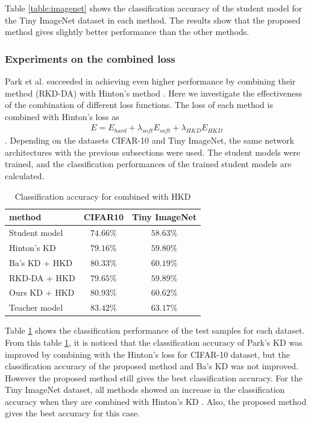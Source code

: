\documentclass[a4paper,12pt]{article}
\begin{document}
Table \ref{table:imagenet} shows the classification accuracy of the student model for the Tiny ImageNet dataset in each method.
The results show that the proposed method gives slightly better performance than the other methods.


\subsubsection{Experiments on the combined loss}

Park et al. \cite{Park2019} succeeded in achieving even higher performance by combining their method (RKD-DA) with Hinton's method \cite{Hinton2015}.
Here we investigate the effectiveness of the combination of different loss functions.
The loss of each method is combined with Hinton's loss as
\begin{align} \label{eq:distillation loss2}
E = E_{hard} + \lambda_{soft} E_{soft} + \lambda_{HKD} E_{HKD}
\end{align}.
Depending on the datasets CIFAR-10 and Tiny ImageNet, the same network architectures with the previous subsections were used.
The student models were trained, and the classification performances of the trained student models are calculated.

\begin{table}[ht]
\caption{Classification accuracy for combined with HKD}
\label{table:combined}
\begin{center}
\begin{tabular}{|l|c|c|}
\hline
method & CIFAR10 & Tiny ImageNet \\ \hline \hline
Student model &$74.66\%$  & $58.63\%$ \\ \hline
Hinton's KD & $79.16\%$ & $59.80\%$  \\ \hline
Ba's KD + HKD & $80.33\%$ & $60.19\%$  \\ \hline
RKD-DA + HKD &  $79.65\%$   & $59.89\%$      \\ \hline
Ours KD + HKD & $\bm{80.93}\%$ & $\bm{60.62}\%$  \\ \hline \hline
Teacher model  & $83.42\%$  & $63.17\%$  \\
\hline
\end{tabular}
\end{center}
\end{table}

Table \ref{table:combined} shows the classification performance of the test samples for each dataset.
From this table \ref{table:combined}, it is noticed that the classification accuracy of Park's KD \cite{Park2019} was improved by combining with the Hinton's loss for CIFAR-10 dataset, but the classification accuracy of the proposed method and Ba's KD \cite{Ba2014} was not improved.
However the proposed method still gives the best classification accuracy.
For the Tiny ImageNet dataset, all methods showed an increase in the classification accuracy when they are combined with Hinton's KD \cite{Hinton2015}.
Also, the proposed method gives the best accuracy for this case.
\end{document}
